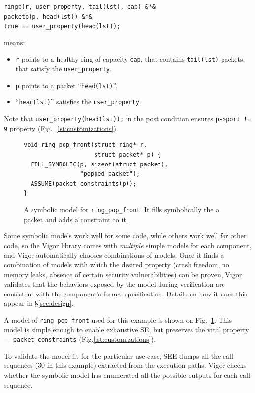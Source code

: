 \documentclass[letterpaper,twocolumn,10pt]{article}
\newcommand{\code}[1]{\lstinline{#1}}
\begin{document}
\begin{lstlisting}
ringp(r, user_property, tail(lst), cap) &*&
packetp(p, head(lst)) &*&
true == user_property(head(lst));
\end{lstlisting}
means:
\begin{itemize}
\item \code{r} points to a healthy ring of capacity \code{cap}, that contains
  \code{tail(lst)} packets, that satisfy the \code{user_property}.
\item \code{p} points to a packet ``\code{head(lst)}''.
\item ``\code{head(lst)}'' satisfies the \code{user_property}.
\end{itemize}

Note that \code{user_property(head(lst));} in the post condition ensures
\code{p->port != 9} property (Fig.~\ref{lst:customizations}).

\begin{figure}[h!]
\begin{lstlisting}
void ring_pop_front(struct ring* r,
                    struct packet* p) {
  FILL_SYMBOLIC(p, sizeof(struct packet),
                "popped_packet");
  ASSUME(packet_constraints(p));
}
\end{lstlisting}
  \caption{A symbolic model for \code{ring_pop_front}. It fills symbolically the
    a packet and adds a constraint to it.}
  \label{lst:symbolic-model}
\end{figure}

Some symbolic models work well for some code, while others work well for other
code, so the Vigor library comes with {\em multiple} simple models for each
component, and Vigor automatically chooses combinations of models. Once it finds
a combination of models with which the desired property (crash freedom, no
memory leaks, absence of certain security vulnerabilities) can be proven, Vigor
validates that the behaviors exposed by the model during verification are
consistent with the component's formal specification. Details on how it does
this appear in \S\ref{sec:design}.

A model of \code{ring_pop_front} used for this example is shown on
Fig.~\ref{lst:symbolic-model}. This model is simple enough to enable
exhaustive SE, but preserves the vital property --- \code{packet_constraints}
(Fig.\ref{lst:customizations}).

To validate the model fit for the particular use case, SEE dumps all the call
sequences (30 in this example) extracted from the execution paths. Vigor
checks whether the symbolic model has enumerated all the possible outputs for
each call sequence.
\end{document}
